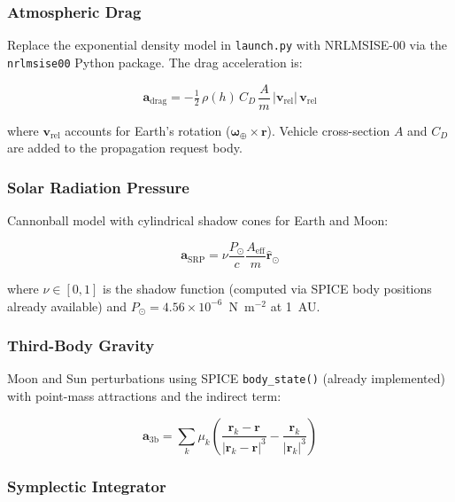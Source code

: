 \documentclass[11pt, a4paper]{article}
\begin{document}
\subsubsection{Atmospheric Drag}

Replace the exponential density model in \texttt{launch.py} with
NRLMSISE-00 via the \texttt{nrlmsise00} Python package. The drag acceleration
is:

\begin{equation}
  \mathbf{a}_\text{drag} = -\tfrac{1}{2}\, \rho(h)\, C_D\, \frac{A}{m}\,
    |\mathbf{v}_\text{rel}|\,\mathbf{v}_\text{rel}
\end{equation}

where $\mathbf{v}_\text{rel}$ accounts for Earth's rotation
($\boldsymbol{\omega}_\oplus \times \mathbf{r}$). Vehicle cross-section $A$
and $C_D$ are added to the propagation request body.

\subsubsection{Solar Radiation Pressure}

Cannonball model with cylindrical shadow cones for Earth and Moon:

\begin{equation}
  \mathbf{a}_\text{SRP} = \nu \frac{P_\odot}{c}
    \frac{A_\text{eff}}{m} \hat{\mathbf{r}}_{\odot}
\end{equation}

where $\nu \in [0,1]$ is the shadow function (computed via SPICE body
positions already available) and $P_\odot = 4.56\times10^{-6}$~N~m$^{-2}$
at 1~AU.

\subsubsection{Third-Body Gravity}

Moon and Sun perturbations using SPICE \texttt{body\_state()} (already
implemented) with point-mass attractions and the indirect term:

\begin{equation}
  \mathbf{a}_\text{3b} = \sum_k \mu_k
    \left(\frac{\mathbf{r}_k - \mathbf{r}}{|\mathbf{r}_k - \mathbf{r}|^3}
          - \frac{\mathbf{r}_k}{|\mathbf{r}_k|^3}\right)
\end{equation}

\subsubsection{Symplectic Integrator}
\end{document}
